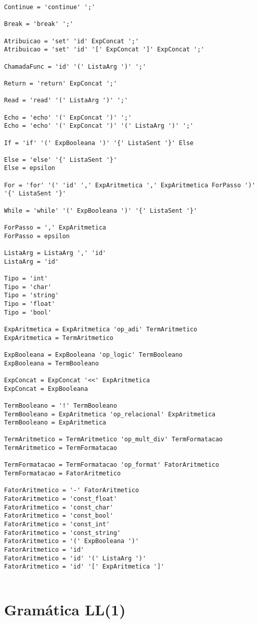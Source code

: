 \documentclass[
  12pt,				%
  oneside,			%
  a4paper,			%
  english,			%
  french,				%
  spanish,			%
  brazil,				%
]{abntex2}
\begin{document}
\begin{lstlisting}[label={code:gramatica-original},caption={Gramática
    original da linguagem de programação LisC.},style={mystyle}]
Continue = 'continue' ';'

Break = 'break' ';'

Atribuicao = 'set' 'id' ExpConcat ';'
Atribuicao = 'set' 'id' '[' ExpConcat ']' ExpConcat ';'

ChamadaFunc = 'id' '(' ListaArg ')' ';'

Return = 'return' ExpConcat ';'

Read = 'read' '(' ListaArg ')' ';'

Echo = 'echo' '(' ExpConcat ')' ';'
Echo = 'echo' '(' ExpConcat ')' '(' ListaArg ')' ';'

If = 'if' '(' ExpBooleana ')' '{' ListaSent '}' Else

Else = 'else' '{' ListaSent '}'
Else = epsilon

For = 'for' '(' 'id' ',' ExpAritmetica ',' ExpAritmetica ForPasso ')' '{' ListaSent '}'

While = 'while' '(' ExpBooleana ')' '{' ListaSent '}'

ForPasso = ',' ExpAritmetica
ForPasso = epsilon

ListaArg = ListaArg ',' 'id'
ListaArg = 'id'

Tipo = 'int'
Tipo = 'char'
Tipo = 'string'
Tipo = 'float'
Tipo = 'bool'

ExpAritmetica = ExpAritmetica 'op_adi' TermAritmetico
ExpAritmetica = TermAritmetico

ExpBooleana = ExpBooleana 'op_logic' TermBooleano
ExpBooleana = TermBooleano

ExpConcat = ExpConcat '<<' ExpAritmetica
ExpConcat = ExpBooleana

TermBooleano = '!' TermBooleano
TermBooleano = ExpAritmetica 'op_relacional' ExpAritmetica
TermBooleano = ExpAritmetica

TermAritmetico = TermAritmetico 'op_mult_div' TermFormatacao
TermAritmetico = TermFormatacao

TermFormatacao = TermFormatacao 'op_format' FatorAritmetico
TermFormatacao = FatorAritmetico

FatorAritmetico = '-' FatorAritmetico
FatorAritmetico = 'const_float'
FatorAritmetico = 'const_char'
FatorAritmetico = 'const_bool'
FatorAritmetico = 'const_int'
FatorAritmetico = 'const_string'
FatorAritmetico = '(' ExpBooleana ')'
FatorAritmetico = 'id'
FatorAritmetico = 'id' '(' ListaArg ')'
FatorAritmetico = 'id' '[' ExpAritmetica ']'


\end{lstlisting}

\chapter{Gramática LL(1)}
\label{cha:gramatica-ll1}
\end{document}
